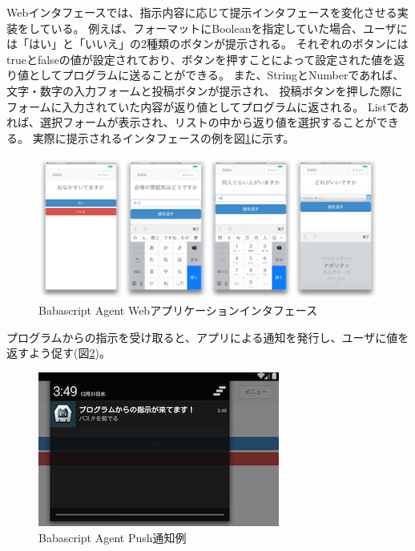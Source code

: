 Webインタフェースでは、指示内容に応じて提示インタフェースを変化させる実装をしている。
例えば、フォーマットにBooleanを指定していた場合、ユーザには「はい」と「いいえ」の2種類のボタンが提示される。
それぞれのボタンにはtrueとfalseの値が設定されており、ボタンを押すことによって設定された値を返り値としてプログラムに送ることができる。
また、StringとNumberであれば、文字・数字の入力フォームと投稿ボタンが提示され、
投稿ボタンを押した際にフォームに入力されていた内容が返り値としてプログラムに返される。
Listであれば、選択フォームが表示され、リストの中から返り値を選択することができる。
実際に提示されるインタフェースの例を図\ref{fig:client_format_list}に示す。

\begin{figure}[htbp]
  \begin{center}
  \includegraphics[width=.8\linewidth,bb=0 0 500 209]{images/client_format_list.png}
  \end{center}
  \caption{Babascript Agent Webアプリケーションインタフェース}
  \label{fig:client_format_list}
\end{figure}

プログラムからの指示を受け取ると、アプリによる通知を発行し、ユーザに値を返すよう促す(図\ref{fig:client-push-notification})。

\begin{figure}[htbp]
  \begin{center}
  \includegraphics[width=.5\linewidth,bb=0 0 300 192]{images/client-push-notification.png}
  \end{center}
  \caption{Babascript Agent Push通知例}
  \label{fig:client-push-notification}
\end{figure}

